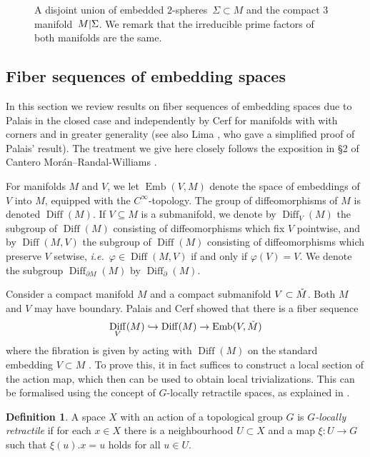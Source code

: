 \documentclass{amsart}
\theoremstyle{plain}
\theoremstyle{definition}
\newtheorem{defn}[thm]{Definition}
\DeclareMathOperator\Diff{Diff}
\DeclareMathOperator\emb{Emb}
\newcommand{\interior}[1]{\smash{\mathring{#1}}}
\newcommand{\ca}{\smash{\mid}} %
\begin{document}
\begin{figure}[ht]
    \centering
    \caption{A disjoint union of embedded $2$-spheres~$\Sigma \subset M$ and the compact 3 manifold~$M\ca \Sigma$. We remark that the irreducible prime factors of both manifolds are the same.}
    \label{fig: M minus Sigma}
\end{figure}



\subsection{Fiber sequences of embedding spaces}
In this section we review results on fiber sequences of embedding spaces due to Palais \cite{Palais60} in the closed case and independently by Cerf \cite{Cerf} for manifolds with with corners and in greater generality (see also Lima \cite{Lima64}, who gave a simplified proof of Palais' result). The treatment we give here closely follows the exposition in \S 2 of Cantero Mor\'an--Randal-Williams \cite{CMRW17}.

For manifolds $M$ and $V$, we let $\emb(V,M)$ denote the space of embeddings of $V$ into $M$, equipped with the $C^\infty$-topology. 
The group of diffeomorphisms of $M$ is denoted $\Diff(M)$. If $V\subseteq M$ is a submanifold, we denote by $\Diff_V(M)$ the subgroup of $\Diff(M)$ consisting of diffeomorphisms which fix $V$ pointwise, and by $\Diff(M,V)$ the subgroup of $\Diff(M)$ consisting of diffeomorphisms which preserve $V$ setwise, \emph{i.e.}~$\varphi\in \Diff(M,V)$ if and only if $\varphi(V) = V$.
We denote the subgroup $\Diff_{\partial M} (M)$ by $\Diff_\partial(M)$.

Consider a compact manifold $M$ and a compact submanifold $V \subset \interior{M}$.
Both $M$ and $V$ may have boundary.
Palais and Cerf showed that there is a fiber sequence
\[\Diff_V(M)\hookrightarrow \Diff(M)\rightarrow \emb(V,\interior{M})\]
where the fibration is given by acting with $\Diff(M)$ on the standard embedding $V \subset M$ \cite{Palais60,Cerf}.
To prove this, it in fact suffices to construct a local section of the action map, which then can be used to obtain local trivializations.
This can be formalised using the concept of $G$-locally retractile spaces, as explained in \cite[\S2.3]{CMRW17}.
\begin{defn}\label{defn:locally-retractile}
    A space $X$ with an action of a topological group $G$ is \emph{$G$-locally retractile} 
    if for each $x \in X$ there is a neighbourhood $U \subset X$ and a map $\xi\colon U \to G$ such that $\xi(u).x = u$ holds for all $u \in U$.
\end{defn}
\end{document}
